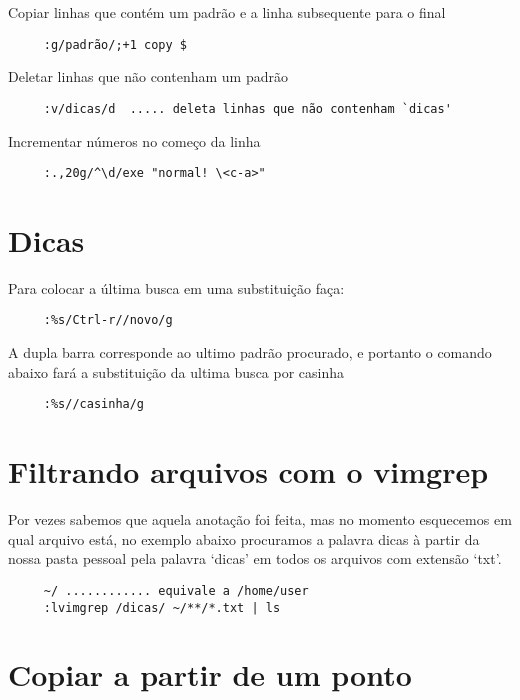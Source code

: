 Copiar linhas que contém um padrão e a linha subsequente para o final

\begin{verbatim}
     :g/padrão/;+1 copy $
\end{verbatim}

Deletar linhas que não contenham um padrão

\begin{verbatim}
     :v/dicas/d  ..... deleta linhas que não contenham `dicas'
\end{verbatim}

Incrementar números no começo da linha

\begin{verbatim}
     :.,20g/^\d/exe "normal! \<c-a>"
\end{verbatim}

\section{Dicas }
Para colocar a última busca em uma substituição faça:

\begin{verbatim}
     :%s/Ctrl-r//novo/g
\end{verbatim}

A dupla barra corresponde ao ultimo padrão procurado, e portanto o
comando abaixo fará a substituição da ultima busca por casinha

\begin{verbatim}
     :%s//casinha/g
\end{verbatim}

\section{Filtrando arquivos com o vimgrep}
\label{Filtrando arquivos com o vimgrep}

Por vezes sabemos que aquela anotação foi feita, mas no momento esquecemos em qual
arquivo está, no exemplo abaixo procuramos a palavra dicas à partir da nossa pasta pessoal
pela palavra `dicas' em todos os arquivos com extensão `txt'.

\begin{verbatim}
     ~/ ............ equivale a /home/user
     :lvimgrep /dicas/ ~/**/*.txt | ls
\end{verbatim}


\section{Copiar a partir de um ponto}

